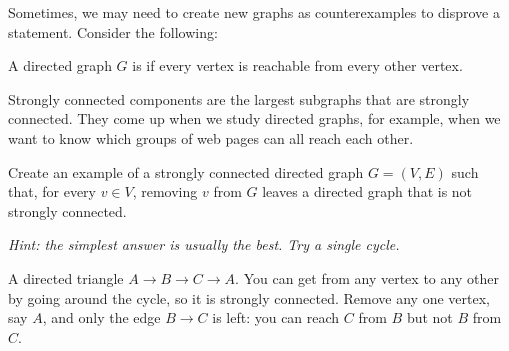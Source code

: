 Sometimes, we may need to create new graphs as counterexamples to disprove a statement. Consider the following:
\begin{definition}
A directed graph $G$ is  if every vertex is reachable from every other vertex.
\end{definition}
Strongly connected components are the largest subgraphs that are strongly connected. They come up when we study directed graphs, for example, when we want to know which groups of web pages can all reach each other.
\begin{Exercise}[title={Strongly Connected Graphs}, label={ex:proofs_strongly_connected}]
Create an example of a strongly connected directed graph $G = (V,E)$ such that, for every $v \in V$,
removing $v$ from $G$ leaves a directed graph that is not strongly connected. 

\textit{Hint: the simplest answer is usually the best. Try a single cycle.}
\end{Exercise}
\begin{Answer}[ref={ex:proofs_strongly_connected}]




A directed triangle $A \to B \to C \to A$. You can get from any vertex to any
other by going around the cycle, so it is strongly connected. Remove any
one vertex, say $A$, and only the edge $B \to C$ is left: you can reach
$C$ from $B$ but not $B$ from $C$.
\end{Answer}
% 
